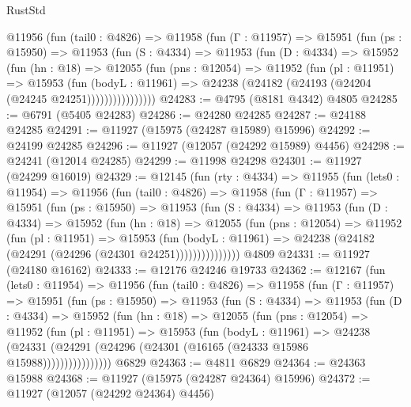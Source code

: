 \begin{lexlean}{RustStd}
\begin{coremodule}
        @11956
          (fun (tail0 : @4826) =>
          @11958
            (fun (Γ : @11957) =>
            @15951
              (fun (ps : @15950) =>
              @11953
                (fun (S : @4334) =>
                @11953
                  (fun (D : @4334) =>
                  @15952
                    (fun (hn : @18) =>
                    @12055
                      (fun (pns : @12054) =>
                      @11952
                        (fun (pl : @11951) =>
                        @15953
                          (fun (bodyL : @11961) =>
                          @24238 (@24182 (@24193 (@24204 (@24245 @24251))))))))))))))))
@24283 := @4795 (@8181 @4342) @4805
@24285 := @6791 (@5405 @24283)
@24286 := @24280 @24285
@24287 := @24188 @24285
@24291 := @11927 (@15975 (@24287 @15989) @15996)
@24292 := @24199 @24285
@24296 := @11927 (@12057 (@24292 @15989) @4456)
@24298 := @24241 (@12014 @24285)
@24299 := @11998 @24298
@24301 := @11927 (@24299 @16019)
@24329 := @12145
    (fun (rty : @4334) =>
    @11955
      (fun (lets0 : @11954) =>
      @11956
        (fun (tail0 : @4826) =>
        @11958
          (fun (Γ : @11957) =>
          @15951
            (fun (ps : @15950) =>
            @11953
              (fun (S : @4334) =>
              @11953
                (fun (D : @4334) =>
                @15952
                  (fun (hn : @18) =>
                  @12055
                    (fun (pns : @12054) =>
                    @11952
                      (fun (pl : @11951) =>
                      @15953
                        (fun (bodyL : @11961) =>
                        @24238 (@24182 (@24291 (@24296 (@24301 @24251)))))))))))))))
    @4809
@24331 := @11927 (@24180 @16162)
@24333 := @12176 @24246 @19733
@24362 := @12167
    (fun (lets0 : @11954) =>
    @11956
      (fun (tail0 : @4826) =>
      @11958
        (fun (Γ : @11957) =>
        @15951
          (fun (ps : @15950) =>
          @11953
            (fun (S : @4334) =>
            @11953
              (fun (D : @4334) =>
              @15952
                (fun (hn : @18) =>
                @12055
                  (fun (pns : @12054) =>
                  @11952
                    (fun (pl : @11951) =>
                    @15953
                      (fun (bodyL : @11961) =>
                      @24238
                        (@24331
                          (@24291 (@24296 (@24301 (@16165 (@24333 @15986 @15988))))))))))))))))
    @6829
@24363 := @4811 @6829
@24364 := @24363 @15988
@24368 := @11927 (@15975 (@24287 @24364) @15996)
@24372 := @11927 (@12057 (@24292 @24364) @4456)

\end{coremodule}
\end{lexlean}
